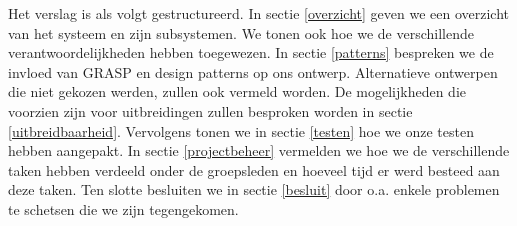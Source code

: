 Het verslag is als volgt gestructureerd. In sectie \ref{overzicht} geven we een overzicht van het systeem en zijn subsystemen.
We tonen ook hoe we de verschillende verantwoordelijkheden hebben toegewezen.
In sectie \ref{patterns} bespreken we de invloed van GRASP en design patterns op ons ontwerp.
Alternatieve ontwerpen die niet gekozen werden, zullen ook vermeld worden.
De mogelijkheden die voorzien zijn voor uitbreidingen zullen besproken worden in sectie \ref{uitbreidbaarheid}.
Vervolgens tonen we in sectie \ref{testen} hoe we onze testen hebben aangepakt.
In sectie \ref{projectbeheer} vermelden we hoe we de verschillende taken hebben verdeeld onder de groepsleden
en hoeveel tijd er werd besteed aan deze taken.
Ten slotte besluiten we in sectie \ref{besluit} door o.a. enkele problemen te schetsen die we zijn tegengekomen.